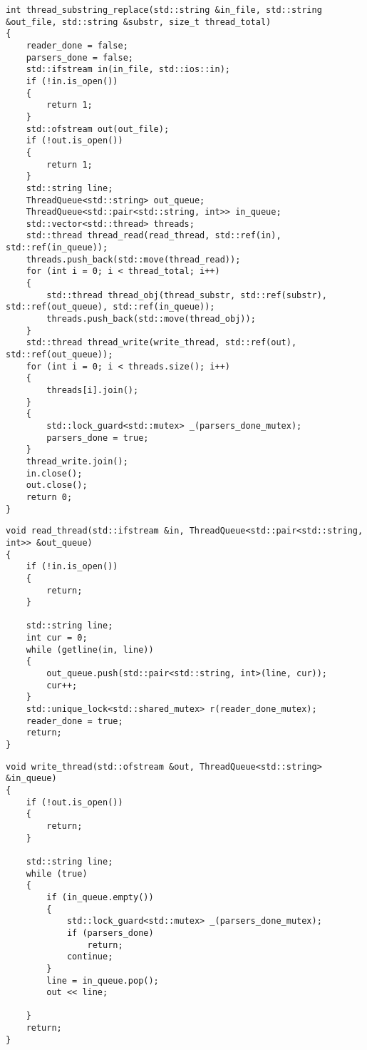 \begin{lstlisting}[label=lst:main_thread,caption=Функция работы основного потока при многопоточной реализации]
int thread_substring_replace(std::string &in_file, std::string &out_file, std::string &substr, size_t thread_total)
{
	reader_done = false;
	parsers_done = false;
	std::ifstream in(in_file, std::ios::in);
	if (!in.is_open())
	{
		return 1;
	}
	std::ofstream out(out_file);
	if (!out.is_open())
	{
		return 1;
	}
	std::string line;
	ThreadQueue<std::string> out_queue;
	ThreadQueue<std::pair<std::string, int>> in_queue;
	std::vector<std::thread> threads;
	std::thread thread_read(read_thread, std::ref(in), std::ref(in_queue));
	threads.push_back(std::move(thread_read));
	for (int i = 0; i < thread_total; i++)
	{
		std::thread thread_obj(thread_substr, std::ref(substr), std::ref(out_queue), std::ref(in_queue));
		threads.push_back(std::move(thread_obj));
	}
	std::thread thread_write(write_thread, std::ref(out), std::ref(out_queue));
	for (int i = 0; i < threads.size(); i++)
	{
		threads[i].join();
	}
	{
		std::lock_guard<std::mutex> _(parsers_done_mutex);
		parsers_done = true;
	}
	thread_write.join();
	in.close();
	out.close();
	return 0;
}
\end{lstlisting}

\clearpage

\begin{lstlisting}[label=lst:read,caption=Функция работы потока-читателя]
void read_thread(std::ifstream &in, ThreadQueue<std::pair<std::string, int>> &out_queue)
{
	if (!in.is_open())
	{
		return;
	}

	std::string line;
	int cur = 0;
	while (getline(in, line))
	{
		out_queue.push(std::pair<std::string, int>(line, cur));
		cur++;
	}
	std::unique_lock<std::shared_mutex> r(reader_done_mutex);
	reader_done = true;
	return;
}
\end{lstlisting}

\clearpage

\begin{lstlisting}[label=lst:write,caption=Функция работы потока-писателя]
void write_thread(std::ofstream &out, ThreadQueue<std::string> &in_queue)
{
	if (!out.is_open())
	{
		return;
	}

	std::string line;
	while (true)
	{
		if (in_queue.empty())
		{
			std::lock_guard<std::mutex> _(parsers_done_mutex);
			if (parsers_done)
				return;
			continue;
		}
		line = in_queue.pop();
		out << line;

	}
	return;
}
\end{lstlisting}

